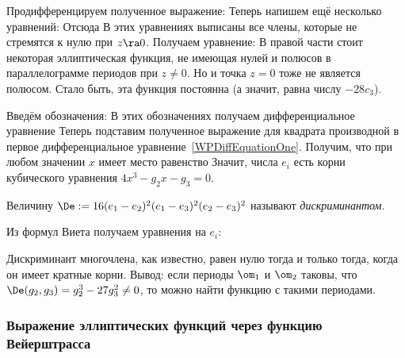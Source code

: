 \documentclass[a4paper]{article}
\begin{document}
Продифференцируем полученное выражение:
Теперь напишем ещё несколько уравнений:
Отсюда
В этих уравнениях выписаны все члены, которые не стремятся к нулю при $z\ra 0$. Получаем уравнение:
В правой части стоит некоторая эллиптическая функция, не имеющая нулей и полюсов
в параллелограмме периодов при $z\neq 0$. Но и точка $z=0$ тоже не является полюсом.
Стало быть, эта функция постоянна (а значит, равна числу $-28c_3$).

Введём обозначения:
В этих обозначениях получаем дифференциальное уравнение
Теперь подставим полученное выражение для квадрата производной в первое дифференциальное
уравнение~\eqref{WPDiffEquationOne}. Получим, что при любом значении $x$ имеет место
равенство
Значит, числа $e_i$ есть корни кубического уравнения $4x^3-g_2x-g_3=0$.

\begin{df}
Величину $\De := 16(e_1-e_2)^2(e_1-e_3)^2(e_2-e_3)^2$ называют \emph{дискриминантом}.
\end{df}

Из формул Виета получаем уравнения на $e_i$:

Дискриминант многочлена, как известно, равен нулю тогда и только тогда, когда он имеет
кратные корни. Вывод: если периоды $\om_1$ и $\om_2$ таковы, что
$\De(g_2,g_3)= g_2^3-27g_3^2 \neq 0$, то можно найти функцию с такими периодами.

\subsubsection{Выражение эллиптических функций через функцию Вейерштрасса}
\end{document}
